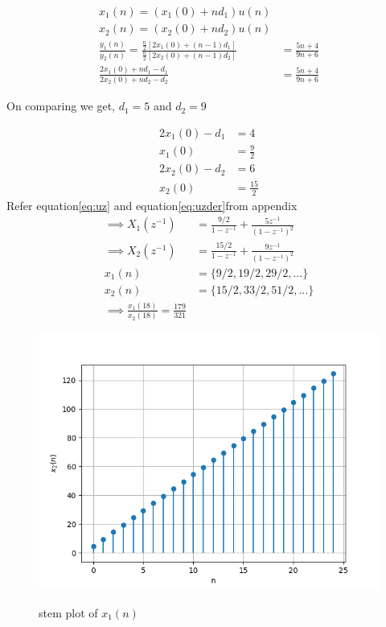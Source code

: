 \documentclass[a4,12pt,onecolumn]{IEEEtran}
\begin{document}
\begin{align}
x_1(n)=(x_1(0)+nd_1)u(n)
\label{ncert_11.9.2.9:1}\\
x_2(n)=(x_2(0)+nd_2)u(n)
\label{ncert_11.9.2.9:2}\\
\frac{y_1(n)}{y_2(n)}=\frac{\frac{n}{2}\left[ 2x_1(0) +(n-1)d_1 \right]}{\frac{n}{2}\left[ 2x_2(0) +(n-1)d_2 \right]}&= \frac{5n+4}{9n+6}\\
\frac{2x_1(0) +nd_1-d_1}{2x_2(0) +nd_2-d_2 }&= \frac{5n+4}{9n+6}
\end{align}
\begin{center}
On comparing we get, $ d_1 = 5 $ and $ d_2 = 9$ \\
\end{center}
\begin{align}
2x_1(0) - d_1 &= 4\\
x_1(0) &=\frac{9}{2}\\
2x_2(0)- d_2&=6\\
x_2(0) &=\frac{15}{2}
\end{align}
Refer equation\eqref{eq:uz}  and equation\eqref{eq:uzder}from appendix
\begin{align}
   \implies X_1(z^{-1}) &=\frac{9/2}{1-z^{-1}} + \frac{ 5z^{-1}}{(1-z^{-1})^2}\\
    \implies X_2(z^{-1})&= \frac{15/2}{1-z^{-1}} + \frac{9z^{-1}}{(1-z^{-1})^2}\\
x_1(n)&= \lbrace 9/2,19/2,29/2,...\rbrace \\
x_2(n)&= \lbrace 15/2,33/2,51/2,...\rbrace \\
\implies \frac{x_1(18)}{x_2(18)}=\frac{179}{321}
\end{align}
\begin{figure}[h!]
	\centering
	\includegraphics[width=\columnwidth]{figs/fig1.png}
	\label{fig:plot}
	\caption{\large{stem plot of $x_1(n)$}}
\end{figure}
\end{document}
